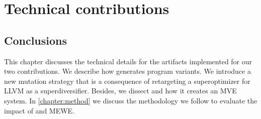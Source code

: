 \chapter{Technical contributions}
\label{chapter:technical}










\section*{Conclusions}

This chapter discusses the technical details for the artifacts implemented for our two contributions.
We describe how generates program variants.
We introduce a new mutation strategy that is a consequence of retargeting a superoptimizer for LLVM as a superdiversifier.
Besides, we dissect and how it creates an MVE system.
In \autoref{chapter:method} we discuss the methodology we follow to evaluate the impact of and MEWE.